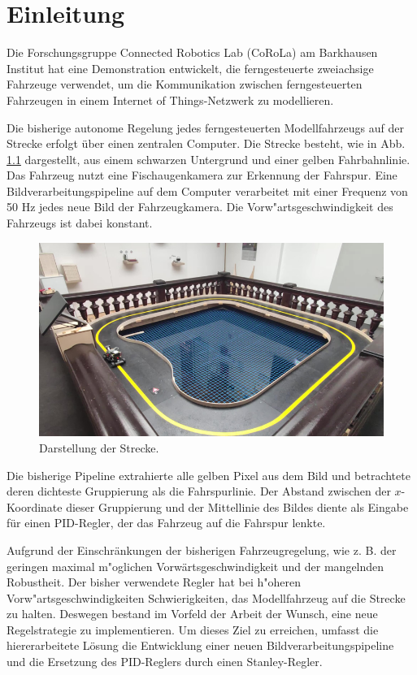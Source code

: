 \documentclass[arbeit=studie,oneside,BCOR=12mm]{ArbeitRST}
\begin{document}
\tableofcontents
{}
\listoffigures

\chapter{Einleitung}

Die Forschungsgruppe Connected Robotics Lab (CoRoLa) am Barkhausen Institut hat
eine Demonstration entwickelt, die ferngesteuerte zweiachsige Fahrzeuge
verwendet, um die Kommunikation zwischen ferngesteuerten Fahrzeugen in einem
\glqq Internet of Things\grqq-Netzwerk zu modellieren.

Die bisherige autonome Regelung jedes ferngesteuerten Modellfahrzeugs auf der
Strecke erfolgt über einen zentralen Computer. Die Strecke besteht, wie in Abb.
\ref{track_and_car} dargestellt, aus einem schwarzen Untergrund und einer
gelben Fahrbahnlinie. 
Das Fahrzeug nutzt eine Fischaugenkamera zur Erkennung der Fahrspur. Eine
Bildverarbeitungspipeline auf dem Computer verarbeitet mit einer Frequenz von
50 Hz jedes neue Bild der Fahrzeugkamera. Die Vorw"artsgeschwindigkeit des
Fahrzeugs ist dabei konstant. 

\begin{figure}[h]
    \centering
    \includegraphics[scale=0.48]{track_and_car}
    \caption{Darstellung der Strecke.}
    \label{track_and_car}
\end{figure}

Die bisherige Pipeline extrahierte alle gelben
Pixel aus dem Bild und betrachtete deren dichteste Gruppierung als die
Fahrspurlinie. Der Abstand zwischen der $x$-Koordinate dieser Gruppierung und
der Mittellinie des Bildes diente als Eingabe für einen PID-Regler, der das
Fahrzeug auf die Fahrspur lenkte. 

Aufgrund der Einschränkungen der bisherigen Fahrzeugregelung, wie z. B. der
geringen maximal m"oglichen Vorwärtsgeschwindigkeit und der mangelnden
Robustheit. Der bisher verwendete Regler hat bei h"oheren Vorw"artsgeschwindigkeiten
Schwierigkeiten, das Modellfahrzeug auf die Strecke zu halten. Deswegen bestand im
Vorfeld der Arbeit der Wunsch, eine neue Regelstrategie
zu implementieren. Um dieses Ziel zu erreichen, umfasst die hiererarbeitete
Lösung die Entwicklung einer neuen Bildverarbeitungspipeline und die Ersetzung des
PID-Reglers durch einen Stanley-Regler.
\end{document}
